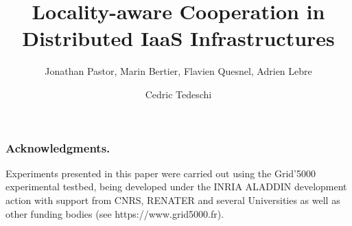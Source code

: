 \documentclass[runningheads,a4paper]{llncs2e/llncs}
\begin{document}
\mainmatter  %

\title{Locality-aware Cooperation in Distributed IaaS Infrastructures}

%
%
\author{Jonathan Pastor, Marin Bertier, Flavien Quesnel,
Adrien Lebre \and Cedric Tedeschi}
%


\maketitle



\listoftodos
 












%
%
%
%
%
%
%

%
%

%

\subsubsection{Acknowledgments.}
Experiments presented in this paper were carried out using the Grid'5000
experimental testbed, being developed under the INRIA ALADDIN development
 action with support from CNRS, RENATER and several Universities as well as
  other funding bodies (see https://www.grid5000.fr).



\end{document}

